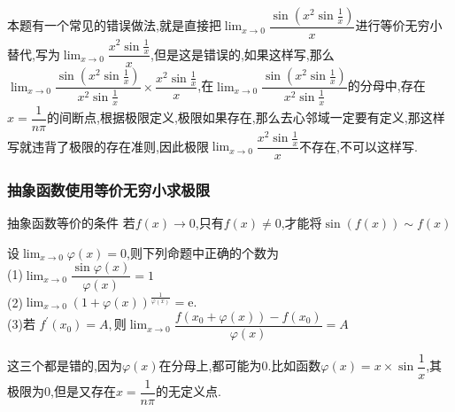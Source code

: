 \documentclass[8pt a4paper, oneside, UTF8]{ctexbook}
\begin{document}
\begin{sloppypar}
\begin{solution}
    \end{solution}
    \begin{note}
        本题有一个常见的错误做法,就是直接把$\lim_{x \to 0}\dfrac{\sin(x^2\sin\frac{1}{x})}{x}$进行等价无穷小替代,写为$\lim_{x \to 0}\dfrac{x^2\sin\frac{1}{x}}{x}$,但是这是错误的,如果这样写,那么$\lim_{x\to0}\dfrac{\sin(x^2\sin\frac{1}{x})}{x^2\sin\frac{1}{x}}\times \dfrac{x^2\sin\frac{1}{x}}{x}$,在$\lim_{x\to0}\dfrac{\sin(x^2\sin\frac{1}{x})}{x^2\sin\frac{1}{x}}$的分母中,存在$x= \dfrac{1}{n\pi}$的间断点,根据极限定义,极限如果存在,那么去心邻域一定要有定义,那这样写就违背了极限的存在准则,因此极限$\lim_{x \to 0}\dfrac{x^2\sin\frac{1}{x}}{x}$不存在,不可以这样写.
    \end{note}
    \subsubsection{抽象函数使用等价无穷小求极限}
    \begin{conclusion}{抽象函数等价的条件}{}
       若$f(x) \to 0$,只有$f(x) \neq 0$,才能将$\sin(f(x))\sim f(x)$
    \end{conclusion}
    \begin{problem}
        设$\lim_{x\to0}\varphi(x)=0$,则下列命题中正确的个数为\\
        (1)$\lim_{x\to0}\dfrac{\sin\varphi(x)}{\varphi(x)}=1$\\
        (2)$\lim_{x\to0}(1+\varphi(x))^{\frac{1}{\varphi(x)}}=\mathrm{e}.$\\
        (3)$\text{若 }f^{\prime}(x_{0})=A,\text{则}\operatorname*{lim}_{x\to0}\dfrac{f(x_{0}+\varphi(x))-f(x_{0})}{\varphi(x)}=A$
    \end{problem}
    \begin{solution}
        这三个都是错的,因为$\varphi(x)$在分母上,都可能为0.比如函数$\varphi(x)=x\times\sin\dfrac{1}{x}$,其极限为0,但是又存在$x=\dfrac{1}{n\pi}$的无定义点.
    \end{solution}

\end{sloppypar}
\end{document}

